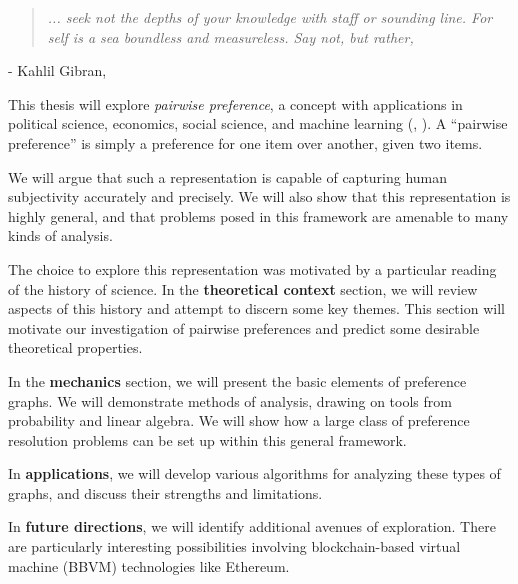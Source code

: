 \begin{center}  
\begin{quotation}
\textit{
	... seek not the depths of your knowledge with staff or sounding line.
	For self is a sea boundless and measureless.
	Say not,  but rather, 
	}
\end{quotation}
- Kahlil Gibran, \textit{} 
\end{center}

This thesis will explore \textit{pairwise preference}, a concept with applications in political science, economics, social science, and machine learning (\cite{jordan}, \cite{arrow}).
A ``pairwise preference'' is simply a preference for one item over another, given two items.

We will argue that such a representation is capable of capturing human subjectivity accurately and precisely.
We will also show that this representation is highly general, and that problems posed in this framework are amenable to many kinds of analysis.

\bigskip

The choice to explore this representation was motivated by a particular reading of the history of science.
In the \textbf{theoretical context} section, we will review aspects of this history and attempt to discern some key themes.
This section will motivate our investigation of pairwise preferences and predict some desirable theoretical properties.

In the \textbf{mechanics} section, we will present the basic elements of preference graphs.
We will demonstrate methods of analysis, drawing on tools from probability and linear algebra.
We will show how a large class of preference resolution problems can be set up within this general framework.

In \textbf{applications}, we will develop various algorithms for analyzing these types of graphs, and discuss their strengths and limitations.

In \textbf{future directions}, we will identify additional avenues of exploration. There are particularly interesting possibilities involving blockchain-based virtual machine (BBVM) technologies like Ethereum.